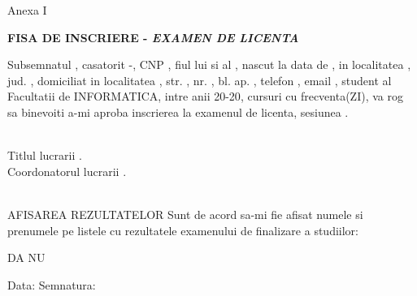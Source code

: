 \begin{flushright}
    Anexa I \\
\end{flushright}

\vspace*{\fill}


\vspace{1cm}
\begin{center}
    \large
    \textbf{FISA DE INSCRIERE - \textit{EXAMEN DE LICENTA}}
\end{center}

\vspace{1cm}

Subsemnatul \textbf{\authorfull}, casatorit -, CNP \textbf{\authorcnp}, fiul lui \textbf{\authorfather} si al \textbf{\authormother}, nascut la data de \textbf{\authorbirth}, in localitatea \textbf{\addresslocalitate}, jud. \textbf{\addressjudet}, domiciliat in localitatea \textbf{\addresslocalitate}, str. \textbf{\addressstrada}, nr. \textbf{\addressnumarstrada}, bl. \textbf{\addressbloc} ap. \textbf{\addressapartament}, telefon \textbf{\addressphone}, email \textbf{\addressemail}, student al Facultatii de INFORMATICA, \university \space intre anii 20\textbf{\yearbegin}-20\textbf{\yearend}, cursuri cu frecventa(ZI), va rog sa binevoiti a-mi aproba inscrierea la examenul de licenta, sesiunea \promotion.

\vspace{1cm}
\hspace{0pt} \\
Titlul lucrarii \textbf{\thesistitle}.\\
Coordonatorul lucrarii \textbf{\coordinator}.
\vspace{1cm}

\hspace{0pt}\\
AFISAREA REZULTATELOR
\newline
Sunt de acord sa-mi fie afisat numele si prenumele pe listele cu rezultatele examenului de finalizare a studiilor:
\newline
\begin{center}
\fbox{$\phantom{1}$} DA \hspace{3cm} \fbox{$\phantom{1}$} NU
\end{center}

\vspace{1cm}

\begin{center}
Data: \dottedline \hspace{4cm} Semnatura: \dottedline
\end{center}

\vspace*{\fill}
\pagebreak